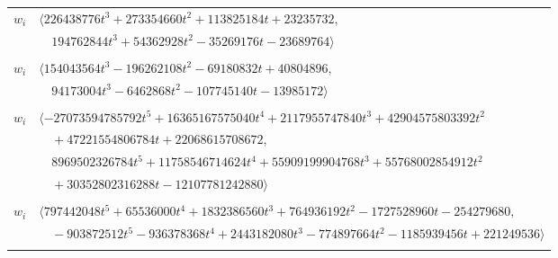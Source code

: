\documentclass[11pt]{article}
\begin{document}
\begin{longtable}{@{}ll@{}}
$w_i$ & $\langle 226438776t^{3}+273354660t^{2}+113825184t+23235732,$\\
 & $\quad 194762844t^{3}+54362928t^{2}-35269176t-23689764\rangle$\\
\addlinespace[2pt]
\multicolumn{2}{@{}p{0.97\textwidth}@{}}{$i=5$, $D_i=262144$, $\rho_{ij}$: $13{:}2, \allowbreak 19{:}2, \allowbreak 20{:}2, \allowbreak 24{:}1, \allowbreak 29{:}2, \allowbreak 33{:}2, \allowbreak 36{:}1, \allowbreak 46{:}1, \allowbreak 51{:}1, \allowbreak 54{:}1, \allowbreak 57{:}2, \allowbreak 60{:}2, \allowbreak 65{:}2, \allowbreak 69{:}1$}\\
$w_i$ & $\langle 154043564t^{3}-196262108t^{2}-69180832t+40804896,$\\
 & $\quad 94173004t^{3}-6462868t^{2}-107745140t-13985172\rangle$\\
\addlinespace[2pt]
\multicolumn{2}{@{}p{0.97\textwidth}@{}}{$i=6$, $D_i=268435456$, $\rho_{ij}$: $1{:}2, \allowbreak 12{:}2, \allowbreak 14{:}1, \allowbreak 16{:}2, \allowbreak 19{:}2, \allowbreak 25{:}1, \allowbreak 34{:}2, \allowbreak 35{:}1, \allowbreak 39{:}2, \allowbreak 44{:}2, \allowbreak 45{:}2, \allowbreak 46{:}2, \allowbreak 51{:}1, \allowbreak 55{:}1, \allowbreak 59{:}1, \allowbreak 71{:}1$}\\
$w_i$ & $\langle -27073594785792t^{5}+16365167575040t^{4}+2117955747840t^{3}+42904575803392t^{2}$\\
 & $\quad +47221554806784t+22068615708672,$\\
 & $\quad 8969502326784t^{5}+11758546714624t^{4}+55909199904768t^{3}+55768002854912t^{2}$\\
 & $\quad +30352802316288t-12107781242880\rangle$\\
\addlinespace[2pt]
\multicolumn{2}{@{}p{0.97\textwidth}@{}}{$i=7$, $D_i=524288$, $\rho_{ij}$: $2{:}2, \allowbreak 11{:}2, \allowbreak 16{:}1, \allowbreak 19{:}2, \allowbreak 23{:}2, \allowbreak 32{:}2, \allowbreak 38{:}2, \allowbreak 44{:}2, \allowbreak 53{:}1, \allowbreak 59{:}2$}\\
$w_i$ & $\langle 797442048t^{5}+65536000t^{4}+1832386560t^{3}+764936192t^{2}-1727528960t-254279680,$\\
 & $\quad -903872512t^{5}-936378368t^{4}+2443182080t^{3}-774897664t^{2}-1185939456t+221249536\rangle$\\
\addlinespace[2pt]
\multicolumn{2}{@{}p{0.97\textwidth}@{}}{$i=8$, $D_i=8388608$, $\rho_{ij}$: $2{:}1, \allowbreak 11{:}2, \allowbreak 24{:}2, \allowbreak 27{:}1, \allowbreak 29{:}2, \allowbreak 33{:}1, \allowbreak 35{:}2, \allowbreak 36{:}1, \allowbreak 45{:}2, \allowbreak 46{:}1, \allowbreak 57{:}1, \allowbreak 59{:}1, \allowbreak 61{:}1, \allowbreak 65{:}2, \allowbreak 66{:}1$}\\

\end{longtable}
\end{document}
